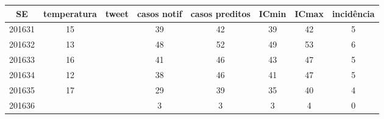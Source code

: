 \begin{tabular}{c|ccccccc}
  \hline
SE & temperatura & tweet & casos notif & casos preditos & ICmin & ICmax & incidência \\ 
  \hline
201631 & 15 &  & 39 & 42 & 39 & 42 & 5 \\ 
  201632 & 13 &  & 48 & 52 & 49 & 53 & 6 \\ 
  201633 & 16 &  & 41 & 46 & 43 & 47 & 5 \\ 
  201634 & 12 &  & 38 & 46 & 41 & 47 & 5 \\ 
  201635 & 17 &  & 29 & 39 & 35 & 40 & 4 \\ 
  201636 &  &  & 3 & 3 & 3 & 4 & 0 \\ 
   \hline
\end{tabular}
